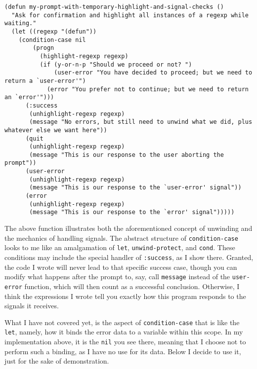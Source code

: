 \documentclass[11pt]{ctexart}
\begin{document}
\begin{verbatim}
(defun my-prompt-with-temporary-highlight-and-signal-checks ()
  "Ask for confirmation and highlight all instances of a regexp while waiting."
  (let ((regexp "(defun"))
    (condition-case nil
        (progn
          (highlight-regexp regexp)
          (if (y-or-n-p "Should we proceed or not? ")
              (user-error "You have decided to proceed; but we need to return a `user-error'")
            (error "You prefer not to continue; but we need to return an `error'")))
      (:success
       (unhighlight-regexp regexp)
       (message "No errors, but still need to unwind what we did, plus whatever else we want here"))
      (quit
       (unhighlight-regexp regexp)
       (message "This is our response to the user aborting the prompt"))
      (user-error
       (unhighlight-regexp regexp)
       (message "This is our response to the `user-error' signal"))
      (error
       (unhighlight-regexp regexp)
       (message "This is our response to the `error' signal")))))
\end{verbatim}

The above function illustrates both the aforementioned concept of unwinding and the mechanics of handling signals. The abstract structure of \texttt{condition-case} looks to me like an amalgamation of \texttt{let}, \texttt{unwind-protect}, and \texttt{cond}. These conditions may include the special handler of \texttt{:success}, as I show there. Granted, the code I wrote will never lead to that specific success case, though you can modify what happens after the prompt to, say, call \texttt{message} instead of the \texttt{user-error} function, which will then count as a successful conclusion. Otherwise, I think the expressions I wrote tell you exactly how this program responds to the signals it receives.

What I have not covered yet, is the aspect of \texttt{condition-case} that is like the \texttt{let}, namely, how it binds the error data to a variable within this scope. In my implementation above, it is the \texttt{nil} you see there, meaning that I choose not to perform such a binding, as I have no use for its data. Below I decide to use it, just for the sake of demonstration.
\end{document}
